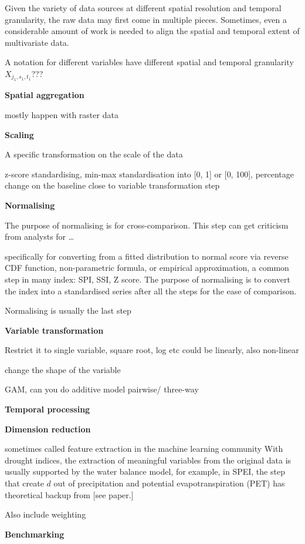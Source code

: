 \documentclass[
]{article}
\begin{document}
Given the variety of data sources at different spatial resolution and
temporal granularity, the raw data may first come in multiple pieces.
Sometimes, even a considerable amount of work is needed to align the
spatial and temporal extent of multivariate data.

A notation for different variables have different spatial and temporal
granularity \(X_{j_1, s_1, t_1}\)???

\textbf{Spatial aggregation}

mostly happen with raster data

\textbf{Scaling}

A specific transformation on the scale of the data

z-score standardising, min-max standardisation into {[}0, 1{]} or {[}0,
100{]}, percentage change on the baseline close to variable
transformation step

\textbf{Normalising}

The purpose of normalising is for cross-comparison. This step can get
criticism from analysts for \ldots{}

specifically for converting from a fitted distribution to normal score
via reverse CDF function, non-parametric formula, or empirical
approximation, a common step in many index: SPI, SSI, Z score. The
purpose of normalising is to convert the index into a standardised
series after all the steps for the ease of comparison.

Normalising is usually the last step

\textbf{Variable transformation}

Restrict it to single variable, square root, log etc could be linearly,
also non-linear

change the shape of the variable

GAM, can you do additive model pairwise/ three-way

\textbf{Temporal processing}

\textbf{Dimension reduction}

sometimes called feature extraction in the machine learning community
With drought indices, the extraction of meaningful variables from the
original data is usually supported by the water balance model, for
example, in SPEI, the step that create \(d\) out of precipitation and
potential evapotranspiration (PET) has theoretical backup from {[}see
paper.{]}

Also include weighting

\textbf{Benchmarking}
\end{document}
